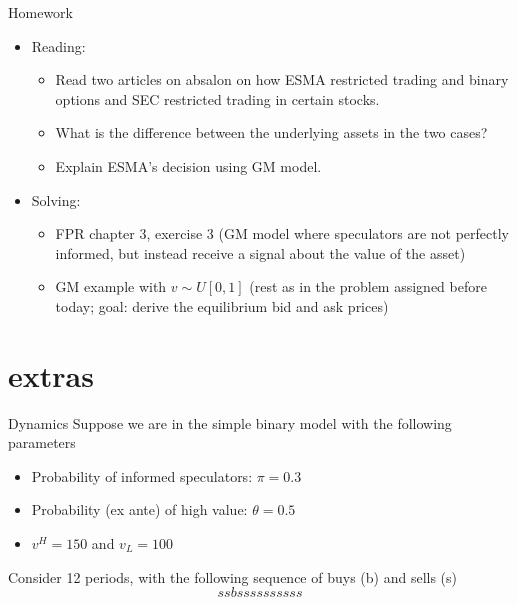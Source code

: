 \documentclass[english,10pt
,aspectratio=169
]{beamer}
\begin{document}
\begin{frame}{Homework}
	\begin{itemize}
		\item Reading:
		\begin{itemize}
			\item Read two articles on absalon on how ESMA restricted trading and binary options and SEC restricted trading in certain stocks.
			\item What is the difference between the underlying assets in the two cases?
			\item Explain ESMA's decision using GM model.
		\end{itemize}
		\item Solving:
		\begin{itemize}
			\item FPR chapter 3, exercise 3 (GM model where speculators are not perfectly informed, but instead receive a signal about the value of the asset)
			\item GM example with $v \sim U[0,1]$ (rest as in the problem assigned before today; goal: derive the equilibrium bid and ask prices)
		\end{itemize}
	\end{itemize}
\end{frame}


\section{extras}

\begin{frame}[label=dynamics]{Dynamics}
	Suppose we are in the simple binary model with the following parameters
	\begin{itemize}
		\item Probability of informed speculators: $\pi = 0.3$
		\item Probability (ex ante) of high value: $\theta = 0.5$
		\item $v^H=150$ and $v_L=100$
	\end{itemize}
	Consider 12 periods, with the following sequence of buys (b) and sells (s)
	\[
	ssbssssssssss
	\]
\end{frame}
\end{document}
